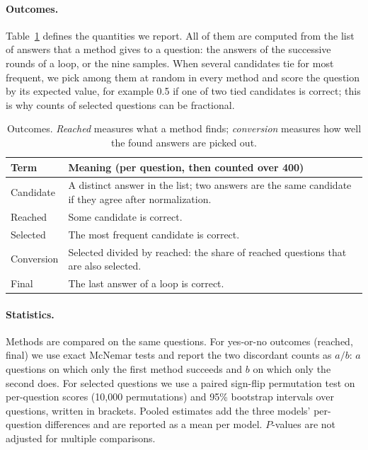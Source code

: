 \documentclass[11pt]{article}
\begin{document}
\paragraph{Outcomes.}
Table~\ref{tab:terms} defines the quantities we report.
All of them are computed from the list of answers that a method gives to a question: the answers of the successive rounds of a loop, or the nine samples.
When several candidates tie for most frequent, we pick among them at random in every method and score the question by its expected value, for example 0.5 if one of two tied candidates is correct; this is why counts of selected questions can be fractional.

\begin{table}[t]
\centering
\small
\setlength{\tabcolsep}{3pt}
\begin{tabular}{@{}lp{5.6cm}@{}}
\toprule
Term & Meaning (per question, then counted over 400) \\
\midrule
Candidate & A distinct answer in the list; two answers are the same candidate if they agree after normalization. \\
Reached & Some candidate is correct. \\
Selected & The most frequent candidate is correct. \\
Conversion & Selected divided by reached: the share of reached questions that are also selected. \\
Final & The last answer of a loop is correct. \\
\bottomrule
\end{tabular}
\caption{Outcomes. \emph{Reached} measures what a method finds; \emph{conversion} measures how well the found answers are picked out.}
\label{tab:terms}
\end{table}

\paragraph{Statistics.}
Methods are compared on the same questions.
For yes-or-no outcomes (reached, final) we use exact McNemar tests and report the two discordant counts as $a/b$: $a$ questions on which only the first method succeeds and $b$ on which only the second does.
For selected questions we use a paired sign-flip permutation test on per-question scores (10{,}000 permutations) and 95\% bootstrap intervals over questions, written in brackets.
Pooled estimates add the three models' per-question differences and are reported as a mean per model.
$P$-values are not adjusted for multiple comparisons.
\end{document}
